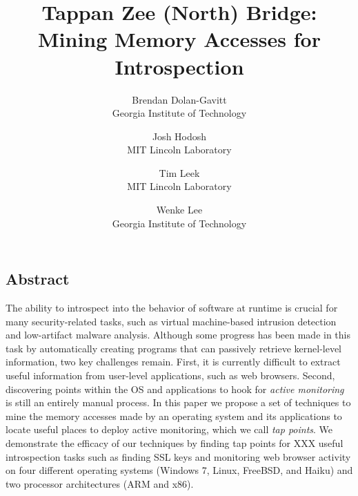 \documentclass[letterpaper,twocolumn,10pt]{article}
\begin{document}
\date{}

\title{\Large \bf Tappan Zee (North) Bridge: Mining Memory Accesses for Introspection}

\author{
{\rm Brendan Dolan-Gavitt}\\
Georgia Institute of Technology
\and
{\rm Josh Hodosh}\\
MIT Lincoln Laboratory
\and
{\rm Tim Leek}\\
MIT Lincoln Laboratory
\and
{\rm Wenke Lee}\\
Georgia Institute of Technology
} %

\maketitle


\subsection*{Abstract}

The ability to introspect into the behavior of software at runtime is
crucial for many security-related tasks, such as virtual machine-based
intrusion detection and low-artifact malware analysis. Although some
progress has been made in this task by automatically creating programs
that can passively retrieve kernel-level information, two key challenges
remain. First, it is currently difficult to extract useful information
from user-level applications, such as web browsers. Second, discovering
points within the OS and applications to hook for \emph{active
monitoring} is still an entirely manual process. In this paper we
propose a set of techniques to mine the memory accesses made by an
operating system and its applications to locate useful places to deploy
active monitoring, which we call \emph{tap points}. We demonstrate the
efficacy of our techniques by finding tap points for XXX useful
introspection tasks such as finding SSL keys and monitoring web browser
activity on four different operating systems (Windows 7, Linux, FreeBSD,
and Haiku) and two processor architectures (ARM and x86).






\end{document}
